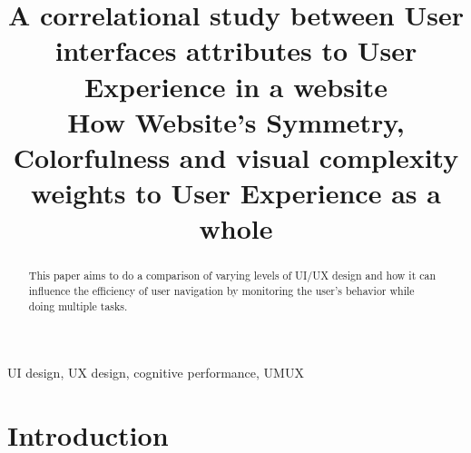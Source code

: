 \documentclass[conference]{IEEEtran}
\begin{document}
\title{A correlational study between User interfaces attributes to User Experience in a website\\
{\footnotesize{} How Website's Symmetry, Colorfulness and visual complexity weights to User Experience as a whole}
}

\author{
    \and
    \and
}

\maketitle

\begin{abstract}
    This paper aims to do a comparison of varying levels of UI/UX design and how it can influence the efficiency of user navigation by monitoring the user's behavior while doing multiple tasks.
\end{abstract}

\begin{IEEEkeywords}
    UI design, UX design, cognitive performance, UMUX
\end{IEEEkeywords}

\section{Introduction}

\end{document}
